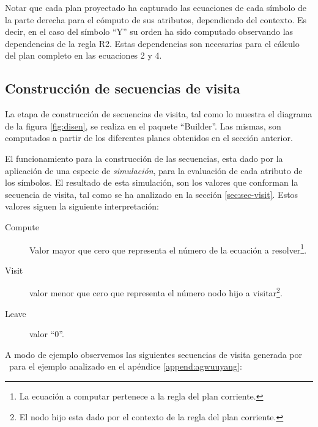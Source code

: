 Notar que cada plan proyectado ha capturado las ecuaciones de cada símbolo de la parte derecha para el cómputo de sus atributos, dependiendo del contexto. Es decir, en el caso del símbolo ``Y'' su orden ha sido computado observando las dependencias de la regla R2. Estas dependencias son necesarias para el cálculo del plan completo en las ecuaciones 2 y 4. 

\subsection*{Construcción de secuencias de visita}
\label{sec:constseqvisit}

La etapa de construcción de secuencias de visita, tal como lo muestra el diagrama de la figura \ref{fig:disen}, se realiza en el paquete ``Builder''. Las mismas, son computados a partir de los diferentes planes obtenidos en el sección anterior.

El funcionamiento para la construcción de las secuencias, esta dado por la aplicación de una especie de \textit{simulación}, para la evaluación de cada atributo de los símbolos. El resultado de esta simulación, son los valores que conforman la secuencia de visita, tal como se ha analizado en la sección \ref{sec:sec-visit}. Estos valores siguen la siguiente interpretación: 

\begin{description}
\item [Compute] Valor mayor que cero que representa el número de la ecuación a resolver\footnote{La ecuación a computar pertenece a la regla del plan corriente.}.
\item [Visit] valor menor que cero que representa el número nodo hijo a visitar\footnote{El nodo hijo esta dado por el contexto de la regla del plan corriente.}.
\item [Leave] valor ``0''.
\end{description}

A modo de ejemplo observemos las siguientes secuencias de visita generada por \maggen\ para el ejemplo analizado en el apéndice \ref{append:agwuuyang}:

